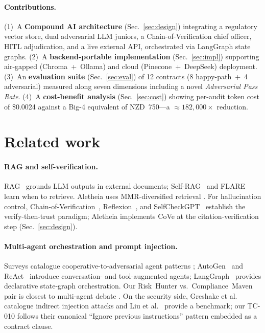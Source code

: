 \documentclass{article}
\begin{document}
\paragraph{Contributions.} (1)~A \textbf{Compound AI architecture}
\cite{zaharia2024compound} (Sec.~\ref{sec:design}) integrating a
regulatory vector store, dual adversarial LLM juniors, a
Chain-of-Verification chief officer, HITL adjudication, and a live
external API, orchestrated via LangGraph state graphs.
(2)~A \textbf{backend-portable implementation} (Sec.~\ref{sec:impl})
supporting air-gapped (Chroma~+~Ollama) and cloud
(Pinecone~+~DeepSeek) deployment.
(3)~An \textbf{evaluation suite} (Sec.~\ref{sec:eval}) of 12 contracts
(8 happy-path~+~4 adversarial) measured along seven dimensions
including a novel \emph{Adversarial Pass Rate}.
(4)~A \textbf{cost-benefit analysis} (Sec.~\ref{sec:cost}) showing
per-audit token cost of \$0.0024 against a Big-4 equivalent of
NZD~750---a $\approx 182{,}000\times$ reduction.

\section{Related work}

\paragraph{RAG and self-verification.}
RAG~\cite{lewis2020rag} grounds LLM outputs in external documents;
Self-RAG~\cite{asai2023selfrag} and FLARE~\cite{jiang2023flare} learn
when to retrieve. Aletheia uses MMR-diversified retrieval
\cite{carbonell1998mmr}. For hallucination control,
Chain-of-Verification~\cite{dhuliawala2023chain},
Reflexion~\cite{shinn2023reflexion}, and
SelfCheckGPT~\cite{manakul2023selfcheckgpt} establish the
verify-then-trust paradigm; Aletheia implements CoVe at the
citation-verification step (Sec.~\ref{sec:design}).

\paragraph{Multi-agent orchestration and prompt injection.} Surveys
catalogue cooperative-to-adversarial agent patterns
\cite{guo2024multiagentsurvey}; AutoGen~\cite{wu2023autogen} and
ReAct~\cite{yao2022react} introduce conversation- and tool-augmented
agents; LangGraph~\cite{langgraph2024} provides declarative
state-graph orchestration. Our Risk~Hunter vs.\ Compliance~Maven pair
is closest to multi-agent debate \cite{du2023debate}. On the security
side, Greshake et al.\ \cite{greshake2023injection} catalogue
indirect injection attacks and Liu et al.\
\cite{liu2024promptinjectionbench} provide a benchmark; our TC-010
follows their canonical ``Ignore previous instructions'' pattern
embedded as a contract clause.
\end{document}
